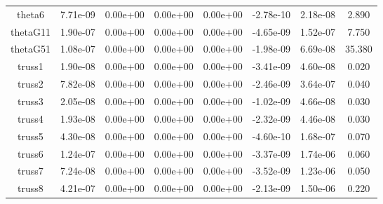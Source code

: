 {{\begin{table}[h]
\begin{center}
{\begin{tabular}{cccccccc}
              theta6 & 7.71e-09 & 0.00e+00 & 0.00e+00 & 0.00e+00 & -2.78e-10 & 2.18e-08 & 2.890 \\ 
            thetaG11 & 1.90e-07 & 0.00e+00 & 0.00e+00 & 0.00e+00 & -4.65e-09 & 1.52e-07 & 7.750 \\ 
            thetaG51 & 1.08e-07 & 0.00e+00 & 0.00e+00 & 0.00e+00 & -1.98e-09 & 6.69e-08 & 35.380 \\ 
              truss1 & 1.90e-08 & 0.00e+00 & 0.00e+00 & 0.00e+00 & -3.41e-09 & 4.60e-08 & 0.020 \\ 
              truss2 & 7.82e-08 & 0.00e+00 & 0.00e+00 & 0.00e+00 & -2.46e-09 & 3.64e-07 & 0.040 \\ 
              truss3 & 2.05e-08 & 0.00e+00 & 0.00e+00 & 0.00e+00 & -1.02e-09 & 4.66e-08 & 0.030 \\ 
              truss4 & 1.93e-08 & 0.00e+00 & 0.00e+00 & 0.00e+00 & -2.32e-09 & 4.46e-08 & 0.030 \\ 
              truss5 & 4.30e-08 & 0.00e+00 & 0.00e+00 & 0.00e+00 & -4.60e-10 & 1.68e-07 & 0.070 \\ 
              truss6 & 1.24e-07 & 0.00e+00 & 0.00e+00 & 0.00e+00 & -3.37e-09 & 1.74e-06 & 0.060 \\ 
              truss7 & 7.24e-08 & 0.00e+00 & 0.00e+00 & 0.00e+00 & -3.52e-09 & 1.23e-06 & 0.050 \\ 
              truss8 & 4.21e-07 & 0.00e+00 & 0.00e+00 & 0.00e+00 & -2.13e-09 & 1.50e-06 & 0.220 \\ 
      \bottomrule
    \end{tabular}
  }  
\end{center}  
\end{table}}}



